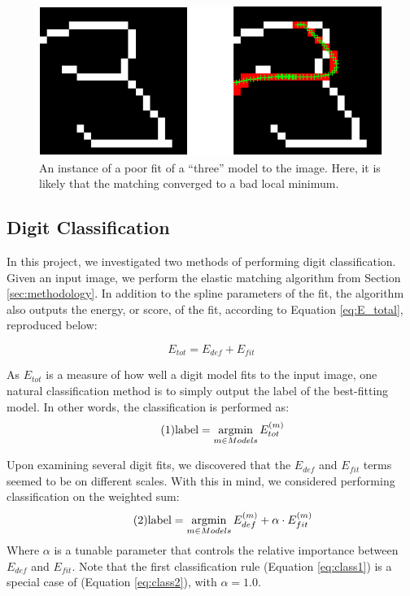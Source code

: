 \documentclass[oribibl]{llncs}
\newcommand\numberthis{\addtocounter{equation}{1}\tag{\theequation}} %
\newcommand{\argmin}{\operatornamewithlimits{argmin}}
\begin{document}
\begin{figure}
\centering
\includegraphics[width=.7\linewidth]{figs/bad_fit_3.png}
\caption{An instance of a poor fit of a ``three'' model to the image.
Here, it is likely that the matching converged to a bad local minimum.
}
\label{fig:bad_fit_3}
\end{figure}


\subsection{Digit Classification}
\label{sec:classify}

In this project, we investigated two methods of performing digit classification.
Given an input image, we perform the elastic matching algorithm from Section \ref{sec:methodology}. 
In addition to the spline parameters of the fit, the algorithm also outputs the energy, or score, of the fit, according to Equation \ref{eq:E_total}, reproduced below:

\begin{equation*}
    E_{tot} = E_{def} + E_{fit}
\end{equation*}    

As $E_{tot}$ is a measure of how well a digit model fits to the input image, one natural classification method is to simply output the label of the best-fitting model.
In other words, the classification is performed as:
\begin{equation*}
\numberthis \label{eq:class1}
\text{label} = \argmin_{m \in Models}{E_{tot}^{(m)}}
\end{equation*}

Upon examining several digit fits, we discovered that the $E_{def}$ and $E_{fit}$ terms seemed to be on different scales.
With this in mind, we considered performing classification on the weighted sum:
\begin{equation*}
\numberthis \label{eq:class2}
\text{label} = \argmin_{m \in Models}{E_{def}^{(m)} + \alpha \cdot E_{fit}^{(m)}}
\end{equation*}
Where $\alpha$ is a tunable parameter that controls the relative importance between $E_{def}$ and $E_{fit}$.
Note that the first classification rule (Equation \ref{eq:class1}) is a special case of (Equation \ref{eq:class2}), with $\alpha = 1.0$.
\end{document}
